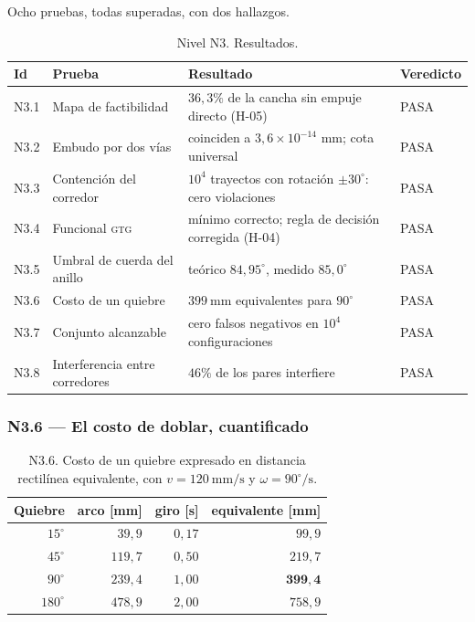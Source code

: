 \documentclass[11pt,a4paper]{article}
\newcommand{\grados}{^{\circ}}
\newcommand{\PASA}{\cellcolor{ok}\textsf{\footnotesize PASA}}
\begin{document}
Ocho pruebas, todas superadas, con dos hallazgos.

\begin{table}[htbp]
\centering
\small
\caption{Nivel N3. Resultados.}
\begin{tabular}{llp{7.4cm}l}
\toprule
Id & Prueba & Resultado & Veredicto \\
\midrule
N3.1 & Mapa de factibilidad & $36{,}3\%$ de la cancha sin empuje directo (H-05) & \PASA \\
N3.2 & Embudo por dos vías & coinciden a $3{,}6\times10^{-14}$ mm; cota universal & \PASA \\
N3.3 & Contención del corredor & $10^4$ trayectos con rotación $\pm30\grados$: cero violaciones & \PASA \\
N3.4 & Funcional \textsc{gtg} & mínimo correcto; regla de decisión corregida (H-04) & \PASA \\
N3.5 & Umbral de cuerda del anillo & teórico $84{,}95\grados$, medido $85{,}0\grados$ & \PASA \\
N3.6 & Costo de un quiebre & $399\ \mathrm{mm}$ equivalentes para $90\grados$ & \PASA \\
N3.7 & Conjunto alcanzable & cero falsos negativos en $10^4$ configuraciones & \PASA \\
N3.8 & Interferencia entre corredores & $46\%$ de los pares interfiere & \PASA \\
\bottomrule
\end{tabular}
\end{table}

\subsubsection{N3.6 --- El costo de doblar, cuantificado}

\begin{table}[htbp]
\centering
\small
\caption{N3.6. Costo de un quiebre expresado en distancia rectilínea equivalente,
con $v=120\ \mathrm{mm/s}$ y $\omega=90\grados/\mathrm{s}$.}
\begin{tabular}{rrrr}
\toprule
Quiebre & arco [mm] & giro [s] & equivalente [mm] \\
\midrule
$15\grados$ & $39{,}9$ & $0{,}17$ & $99{,}9$ \\
$45\grados$ & $119{,}7$ & $0{,}50$ & $219{,}7$ \\
$90\grados$ & $239{,}4$ & $1{,}00$ & $\mathbf{399{,}4}$ \\
$180\grados$ & $478{,}9$ & $2{,}00$ & $758{,}9$ \\
\bottomrule
\end{tabular}
\end{table}
\end{document}
